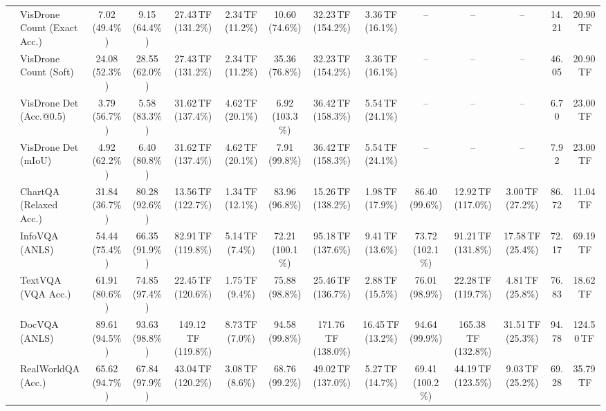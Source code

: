 \begin{table}[t]
\begin{center}
\begin{small}
\begin{sc}
{\begin{tabular}{llcccccccccccc}
& VisDrone Count (Exact Acc.) & 7.02 (49.4\%) & 9.15 (64.4\%) & 27.43\,TF (131.2\%) & 2.34\,TF (11.2\%) & 10.60 (74.6\%) & 32.23\,TF (154.2\%) & 3.36\,TF (16.1\%) & -- & -- & -- & 14.21 & 20.90\,TF \\
& VisDrone Count (Soft) & 24.08 (52.3\%) & 28.55 (62.0\%) & 27.43\,TF (131.2\%) & 2.34\,TF (11.2\%) & 35.36 (76.8\%) & 32.23\,TF (154.2\%) & 3.36\,TF (16.1\%) & -- & -- & -- & 46.05 & 20.90\,TF \\
& VisDrone Det (Acc.@0.5) & 3.79 (56.7\%) & 5.58 (83.3\%) & 31.62\,TF (137.4\%) & 4.62\,TF (20.1\%) & 6.92 (103.3\%) & 36.42\,TF (158.3\%) & 5.54\,TF (24.1\%) & -- & -- & -- & 6.70 & 23.00\,TF \\
& VisDrone Det (mIoU) & 4.92 (62.2\%) & 6.40 (80.8\%) & 31.62\,TF (137.4\%) & 4.62\,TF (20.1\%) & 7.91 (99.8\%) & 36.42\,TF (158.3\%) & 5.54\,TF (24.1\%) & -- & -- & -- & 7.92 & 23.00\,TF \\
\midrule\midrule
{}
& ChartQA (Relaxed Acc.) & 31.84 (36.7\%) & 80.28 (92.6\%) & 13.56\,TF (122.7\%) & 1.34\,TF (12.1\%) & 83.96 (96.8\%) & 15.26\,TF (138.2\%) & 1.98\,TF (17.9\%) & 86.40 (99.6\%) & 12.92\,TF (117.0\%) & 3.00\,TF (27.2\%) & 86.72 & 11.04\,TF \\
& InfoVQA (ANLS) & 54.44 (75.4\%) & 66.35 (91.9\%) & 82.91\,TF (119.8\%) & 5.14\,TF (7.4\%) & 72.21 (100.1\%) & 95.18\,TF (137.6\%) & 9.41\,TF (13.6\%) & 73.72 (102.1\%) & 91.21\,TF (131.8\%) & 17.58\,TF (25.4\%) & 72.17 & 69.19\,TF \\
& TextVQA (VQA Acc.) & 61.91 (80.6\%) & 74.85 (97.4\%) & 22.45\,TF (120.6\%) & 1.75\,TF (9.4\%) & 75.88 (98.8\%) & 25.46\,TF (136.7\%) & 2.88\,TF (15.5\%) & 76.01 (98.9\%) & 22.28\,TF (119.7\%) & 4.81\,TF (25.8\%) & 76.83 & 18.62\,TF \\
& DocVQA (ANLS) & 89.61 (94.5\%) & 93.63 (98.8\%) & 149.12\,TF (119.8\%) & 8.73\,TF (7.0\%) & 94.58 (99.8\%) & 171.76\,TF (138.0\%) & 16.45\,TF (13.2\%) & 94.64 (99.9\%) & 165.38\,TF (132.8\%) & 31.51\,TF (25.3\%) & 94.78 & 124.50\,TF \\
& RealWorldQA (Acc.) & 65.62 (94.7\%) & 67.84 (97.9\%) & 43.04\,TF (120.2\%) & 3.08\,TF (8.6\%) & 68.76 (99.2\%) & 49.02\,TF (137.0\%) & 5.27\,TF (14.7\%) & 69.41 (100.2\%) & 44.19\,TF (123.5\%) & 9.03\,TF (25.2\%) & 69.28 & 35.79\,TF \\

\end{tabular}}
\end{sc}
\end{small}
\end{center}
\end{table}
